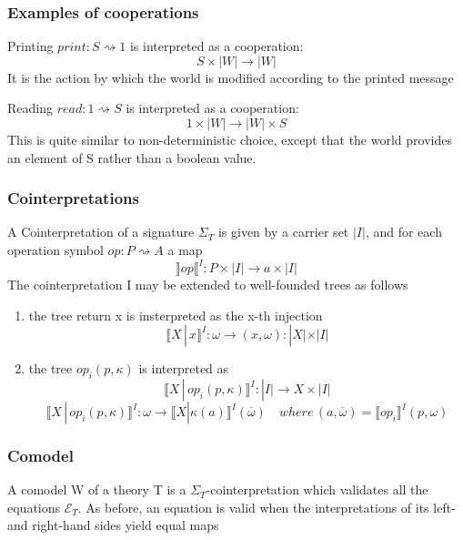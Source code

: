 \documentclass{beamer}
\begin{document}
\begin{frame}
    \frametitle{Examples of cooperations}
    \begin{example}
        Printing $print : S \rightsquigarrow 1$ is interpreted as a cooperation:
        \[
          S \times |W| \rightarrow  |W|  
        \]
        It is the action by which the world is modified according to the printed message 
    \end{example}
    \begin{example}
        Reading $read : 1 \rightsquigarrow S$ is interpreted as a cooperation:
        \[
          1 \times |W| \rightarrow  |W| \times S 
        \]
        This is quite similar to non-deterministic choice, except that the world provides an element
of S rather than a boolean value.
    \end{example}
 

    

\end{frame}
\begin{frame}
    \frametitle{Cointerpretations}
    A Cointerpretation of a signature $\Sigma_T$ is given by a carrier set $|I|$, and for each operation symbol
    $op : P \rightsquigarrow A$ a map 
    \[
      \rrbracket op \llbracket^I : P \times |I| \rightarrow a \times |I|  
    \]
    The cointerpretation I may be extended to well-founded trees as follows
    \begin{enumerate}
        \item the tree return x is insterpreted as the x-th injection 
        \[
          \llbracket X \, | \, x \rrbracket^I : \omega \rightarrow (x, \omega) : |X| \times|I|   
        \]
        \item the tree $op_i(p, \kappa)$ is interpreted as 
         \[
            \llbracket X \, | \, op_i(p, \kappa) \rrbracket^I : |I| \rightarrow X \times |I|
        \]
        \[
            \llbracket X \, | \, op_i(p, \kappa) \rrbracket^I : \omega \rightarrow \llbracket X 
            | \kappa(a) \rrbracket^I (\overline{\omega}) 
            \quad where \, (a, \overline{\omega}) = \llbracket op_i \rrbracket^I(p, \omega)
        \]
       
    \end{enumerate}

    

\end{frame}
\begin{frame}
    \frametitle{Comodel}
    A comodel W of a theory T is a $\Sigma_T$-cointerpretation which validates all the equations $\mathcal{E}_T$.
As before, an equation is valid when the interpretations of its left- and right-hand sides
yield equal maps

    

\end{frame}
\end{document}
